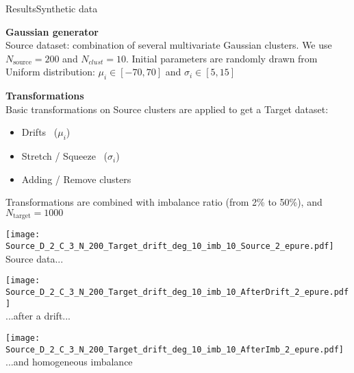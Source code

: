 \begin{frame}{Results}{Synthetic data}
    
\begin{minipage}[t]{0.49\linewidth}
    \vspace{0pt}
    \textbf{Gaussian generator}\\
    Source dataset: combination of several multivariate Gaussian clusters.
    We use $N_\text{source} = 200$ and $N_{clust} = 10$.
    Initial parameters are randomly drawn from Uniform distribution: $\mu_i \in [-70,70]$ and $\sigma_i \in [5,15]$
\end{minipage}\hfill
\begin{minipage}[t]{0.49\linewidth}
    \vspace{0pt}
    \textbf{Transformations}\\
    Basic transformations on Source clusters are applied to get a Target dataset:
    \begin{itemize}
        \item Drifts  \, ($\mu_i$)
        \item Stretch / Squeeze \, ($\sigma_i$)
        \item Adding / Remove clusters
    \end{itemize}
    Transformations are combined with imbalance ratio (from 2\% to 50\%), and $N_\text{target} = 1000$
\end{minipage}

\bigskip
\centering
\begin{minipage}[t]{0.7\linewidth}
    \vspace{0pt}
    \renewcommand{\ratio}{0.32}
    \renewcommand{\ratiob}{0.85}
    \begin{minipage}[t]{\ratio\linewidth}\vspace{0pt}
        \centering
        \texttt{[image: Source\_D\_2\_C\_3\_N\_200\_Target\_drift\_deg\_10\_imb\_10\_Source\_2\_epure.pdf]}\\
        {\small Source data...}
    \end{minipage}
    \begin{minipage}[t]{\ratio\linewidth}\vspace{0cm}
        \centering
        \texttt{[image: Source\_D\_2\_C\_3\_N\_200\_Target\_drift\_deg\_10\_imb\_10\_AfterDrift\_2\_epure.pdf]}\\
        {\small ...after a drift...}
    \end{minipage}
    \begin{minipage}[t]{\ratio\linewidth}\vspace{0cm}
        \centering
        \texttt{[image: Source\_D\_2\_C\_3\_N\_200\_Target\_drift\_deg\_10\_imb\_10\_AfterImb\_2\_epure.pdf]}\\
        {\small ...and homogeneous imbalance}
    \end{minipage}
\end{minipage}

\end{frame}

